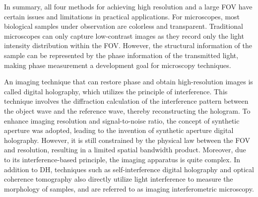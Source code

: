 \documentclass[journal,review,submit,pdftex,moreauthors]{Definitions/mdpi}
\begin{document}
In summary, all four methods for achieving high resolution and a large FOV have certain issues and limitations in practical applications. For microscopes, most biological samples under observation are colorless and transparent. Traditional microscopes can only capture low-contrast images as they record only the light intensity distribution within the FOV. However, the structural information of the sample can be represented by the phase information of the transmitted light\cite{thorn2016quick}, making phase measurement a development goal for microscopy techniques.

An imaging technique that can restore phase and obtain high-resolution images is called digital holography\cite{javidi2021roadmap}, which utilizes the principle of interference. This technique involves the diffraction calculation of the interference pattern between the object wave and the reference wave, thereby reconstructing the hologram. To enhance imaging resolution and signal-to-noise ratio, the concept of synthetic aperture was adopted, leading to the invention of synthetic aperture digital holography\cite{le2001synthetic,massig2002digital}. However, it is still constrained by the physical law between the FOV and resolution, resulting in a limited spatial bandwidth product. Moreover, due to its interference-based principle, the imaging apparatus is quite complex. In addition to DH, techniques such as self-interference digital holography\cite{rosen2007digital} and optical coherence tomography\cite{huang1991optical,podoleanu2012optical} also directly utilize light interference to measure the morphology of samples, and are referred to as imaging interferometric microscopy.
\end{document}
